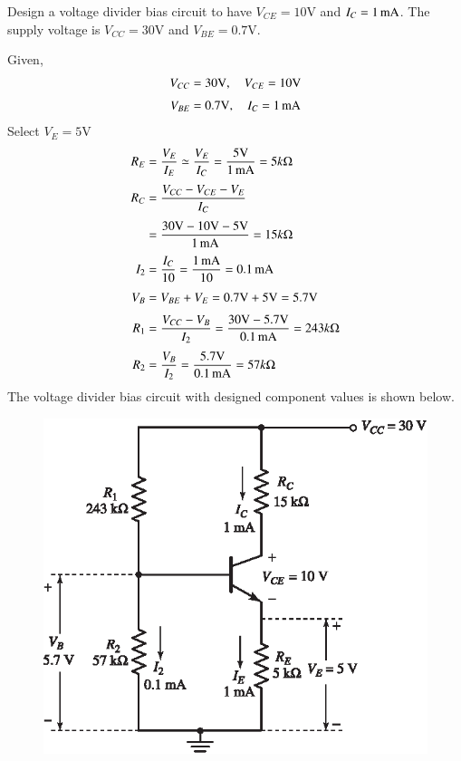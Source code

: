 \begin{example}\label{exam4.20}
Design a voltage divider bias circuit to have $V_{CE}=10\text{V}$ and $I_{C}=1\text{\,mA}$. The supply voltage is $V_{CC}=30\text{V}$ and $V_{BE}=0.7\text{V}$.
\end{example}

\begin{solution}
Given,
\begin{align*}
V_{CC} &= 30\text{V},\quad V_{CE}=10\text{V}\\[3pt]
V_{BE} &= 0.7\text{V},\quad I_{C}=1\text{\,mA}
\end{align*}
Select $V_{E}=5\text{V}$
\begin{align*}
R_{E} &= \frac{V_{E}}{I_{E}}\simeq \frac{V_{E}}{I_{C}}=\frac{5\text{V}}{1\text{\,mA}}=5 k\Omega\\[3pt]
R_{C} &= \frac{V_{CC}-V_{CE}-V_{E}}{I_{C}}\\[3pt]
&= \frac{30\text{V}-10\text{V}-5\text{V}}{1\,\text{mA}}= 15 k\Omega\\[3pt]
I_{2} &= \frac{I_{C}}{10}=\frac{1\text{\,mA}}{10}=0.1\text{\,mA}\\[3pt]
V_{B} &= V_{BE}+V_{E}=0.7\text{V}+5\text{V}=5.7\text{V}\\[3pt]
R_{1} &= \frac{V_{CC}-V_{B}}{I_{2}}=\frac{30\text{V}-5.7\text{V}}{0.1\text{\,mA}}=243 k\Omega\\[3pt]
R_{2} &= \frac{V_{B}}{I_{2}}=\frac{5.7\text{V}}{0.1\text{\,mA}}=57 k\Omega
\end{align*}
The voltage divider bias circuit with designed component values is shown below.
\begin{figure}[H]
\centering
\includegraphics[scale=1.05]{chap3/S3-EE-03-IN031.eps}
\end{figure}
\vskip -1cm
\end{solution}

